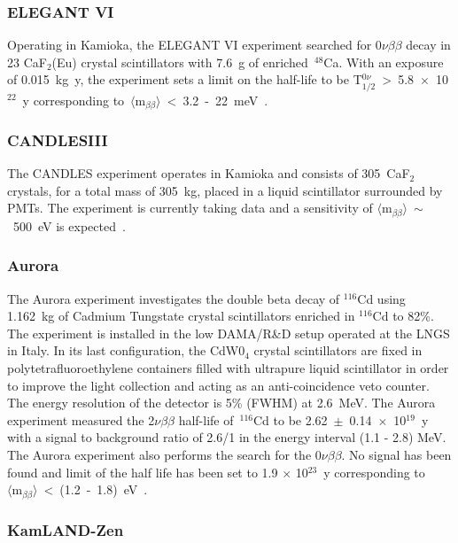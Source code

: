 \documentclass[main.tex]{subfiles}
\begin{document}
\subsubsection{ELEGANT VI}


\NI Operating in Kamioka, the ELEGANT VI experiment searched for 0$\nu\beta\beta$ decay in 23 CaF$_\text{2}$(Eu) crystal scintillators with 7.6~g of enriched~$^{\text{48}}$Ca. With an exposure of 0.015~kg~y, the experiment sets a limit on the half-life to be T$_{\text{1/2}}^{0\nu}$~>~5.8~$\times$~10$^{\text{22}}$~y corresponding to~$\langle \text{m}_{\beta\beta} \rangle$~<~3.2~-~22~meV~\cite{ELEGANTVI}.


\subsubsection{CANDLESIII}


\NI The CANDLES experiment operates in Kamioka and consists of 305~CaF$_\text{2}$ crystals, for a total mass of 305~kg, placed in a liquid scintillator surrounded by PMTs. The experiment is currently taking data and a sensitivity of $\langle \text{m}_{\beta\beta} \rangle$~$\sim$~500~eV is expected~\cite{CANDLESIII}.


\subsubsection{Aurora}


\NI The Aurora experiment investigates the double beta decay of $^{\text{116}}$Cd using 1.162~kg of Cadmium Tungstate crystal scintillators enriched in $^{\text{116}}$Cd to 82\%. The experiment is installed in the low DAMA/R\&D setup operated at the LNGS in Italy. In its last configuration, the CdW0$_\text{4}$ crystal scintillators are fixed in polytetrafluoroethylene containers filled with ultrapure liquid scintillator in order to improve the light collection and acting as an anti-coincidence veto counter. The energy resolution of the detector is 5\% (FWHM) at 2.6~MeV. The Aurora experiment measured the 2$\nu\beta\beta$ half-life of~$^{\text{116}}$Cd to be 2.62~$\pm$~0.14~$\times$~10$^{\text{19}}$~y with a signal to background ratio of 2.6/1 in the energy interval (1.1 - 2.8) MeV. The Aurora experiment also performs the search for the 0$\nu\beta\beta$. No signal has been found and limit of the half life has been set to 1.9 $\times$ 10$^{\text{23}}$~y corresponding to~$\langle \text{m}_{\beta\beta} \rangle$~<~(1.2~-~1.8)~eV~\cite{AuroraRecent}.  


\subsubsection{KamLAND-Zen}
\end{document}
